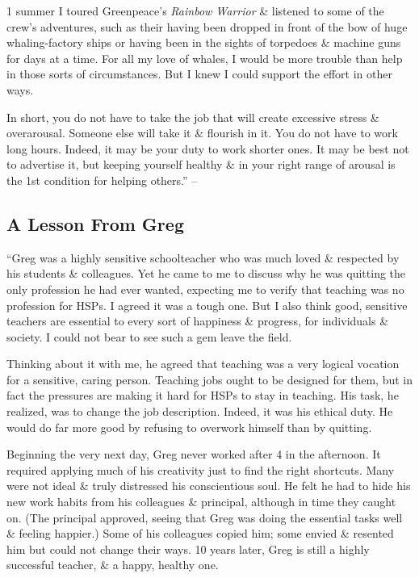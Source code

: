 \documentclass{article}
\numberwithin{equation}{section}
\begin{document}
1 summer I toured Greenpeace's \textit{Rainbow Warrior} \& listened to some of the crew's adventures, such as their having been dropped in front of the bow of huge whaling-factory ships or having been in the sights of torpedoes \& machine guns for days at a time. For all my love of whales, I would be more trouble than help in those sorts of circumstances. But I knew I could support the effort in other ways.

In short, you do not have to take the job that will create excessive stress \& overarousal. Someone else will take it \& flourish in it. You do not have to work long hours. Indeed, it may be your duty to work shorter ones. It may be best not to advertise it, but keeping yourself healthy \& in your right range of arousal is the 1st condition for helping others.'' -- \cite[p. 157]{Aron2013}

\subsection{A Lesson From Greg}
``Greg was a highly sensitive schoolteacher who was much loved \& respected by his students \& colleagues. Yet he came to me to discuss why he was quitting the only profession he had ever wanted, expecting me to verify that teaching was no profession for HSPs. I agreed it was a tough one. But I also think good, sensitive teachers are essential to every sort of happiness \& progress, for individuals \& society. I could not bear to see such a gem leave the field.

Thinking about it with me, he agreed that teaching was a very logical vocation for a sensitive, caring person. Teaching jobs ought to be designed for them, but in fact the pressures are making it hard for HSPs to stay in teaching. His task, he realized, was to change the job description. Indeed, it was his ethical duty. He would do far more good by refusing to overwork himself than by quitting.

Beginning the very next day, Greg never worked after 4 in the afternoon. It required applying much of his creativity just to find the right shortcuts. Many were not ideal \& truly distressed his conscientious soul. He felt he had to hide his new work habits from his colleagues \& principal, although in time they caught on. (The principal approved, seeing that Greg was doing the essential tasks well \& feeling happier.) Some of his colleagues copied him; some envied \& resented him but could not change their ways. 10 years later, Greg is still a highly successful teacher, \& a happy, healthy one.
\end{document}
